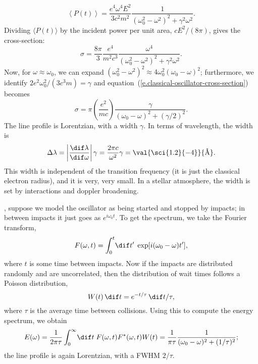 \begin{sidebar}
\[
	\left\langle P(t)\right\rangle = \frac{e^{4}\omega^{4} E^{2}}{3 c^{2}m^{2}}
	\frac{1}{(\omega_{0}^{2}-\omega^{2})^{2} + \gamma^{2}\omega^{2}}.
\]
Dividing $\langle P(t)\rangle$ by the incident power per unit area, $cE^{2}/(8\pi)$, gives the cross-section:
\begin{equation}\label{e.classical-oscillator-cross-section}
	\sigma = \frac{8\pi}{3}\frac{e^{4}}{m^{2}c^{3}}
	\frac{\omega^{4}}{(\omega_{0}^{2}-\omega^{2})^{2} + \gamma^{2}\omega^{2}}.
\end{equation}
Now, for $\omega \approx \omega_{0}$, we can expand $(\omega_{0}^{2}-\omega^{2})^{2} \approx 4\omega_{0}^{2}(\omega_{0}-\omega)^{2}$; furthermore, we identify $2e^{2}\omega_{0}^{2}/(3c^{3}m) = \gamma$ and equation~(\ref{e.classical-oscillator-cross-section}) becomes
\begin{equation}\label{e.cross-section-lorentz}
	\sigma = \pi\left(\frac{e^{2}}{mc}\right)\frac{\gamma}{(\omega_{0}-\omega)^{2} + (\gamma/2)^{2}}.
\end{equation}
The line profile is Lorentzian, with a width $\gamma$. In terms of wavelength, the width is
\[ 
	\Delta \lambda = \left|\frac{\dif\lambda}{\dif\omega}\right|\gamma = \frac{2\pi c}{\omega^{2}}\gamma
	= \val{\sci{1.2}{-4}}{\textrm{\AA}}.
\]
This width is independent of the transition frequency (it is just the classical electron radius), and it is very, very small.  In a stellar atmosphere, the width is set by interactions and doppler broadening.

, suppose we model the oscillator as being started and stopped by impacts; in between impacts it just goes as $e^{i\omega_{0}t}$.  To get the spectrum, we take the Fourier transform,
\[
	F(\omega,t) = \int_{0}^{t}\!\dif t'\; \exp[i(\omega_{0}-\omega)t'],
\]
where $t$ is some time between impacts. Now if the impacts are distributed randomly and are uncorrelated, then the distribution of wait times follows a Poisson distribution,
\[ W(t)\,\dif t = e^{-t/\tau}\,\dif t/\tau, \]
where $\tau$ is the average time between collisions.  Using this to compute the energy spectrum, we obtain
\[ E(\omega) = \frac{1}{2\pi\tau}\int_{0}^{\infty}\!\dif t\; F(\omega,t)F^{*}(\omega,t)W(t) = \frac{1}{\pi\tau} 
	\frac{1}{(\omega_{0}-\omega)^{2} + (1/\tau)^{2}};
\]
the line profile is again Lorentzian, with a FWHM $2/\tau$.
\end{sidebar}

